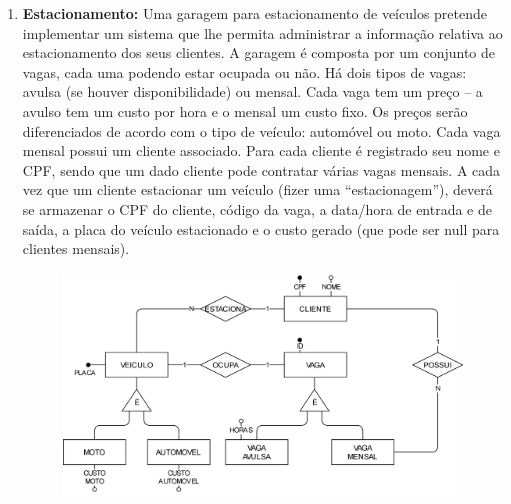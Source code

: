 \documentclass[a4paper, 12pt]{article}
\begin{document}
\begin{enumerate}
		\item \textbf{Estacionamento:} Uma garagem para estacionamento de veículos pretende implementar um sistema que lhe
		permita administrar a informação relativa ao estacionamento dos seus clientes. A garagem é
		composta por um conjunto de vagas, cada uma podendo estar ocupada ou não. Há dois tipos
		de vagas: avulsa (se houver disponibilidade) ou mensal. Cada vaga tem um preço – a avulso
		tem um custo por hora e o mensal um custo fixo. Os preços serão diferenciados de acordo com
		o tipo de veículo: automóvel ou moto. Cada vaga mensal possui um cliente associado. Para
		cada cliente é registrado seu nome e CPF, sendo que um dado cliente pode contratar várias
		vagas mensais. A cada vez que um cliente estacionar um veículo (fizer uma “estacionagem”),
		deverá se armazenar o CPF do cliente, código da vaga, a data/hora de entrada e de saída, a
		placa do veículo estacionado e o custo gerado (que pode ser null para clientes mensais).
		
		\begin{figure}[H]
			\centering
			\includegraphics[width=1\textwidth]{LISTA 01 - EX 7 RESOLUÇÃO.png}
		\end{figure}
		\newpage
		
	\end{enumerate}
		
\end{document}
